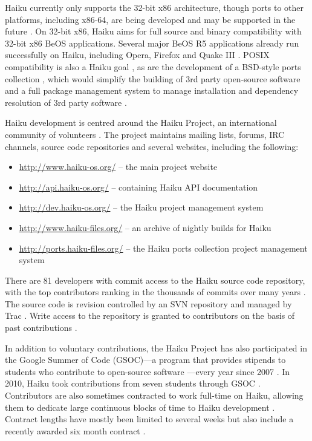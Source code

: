 \documentclass{article}
\begin{document}
Haiku currently only supports the 32-bit x86 architecture, though
ports to other platforms, including x86-64, are being developed and
may be supported in the future \cite{HaikuFaq}.  On 32-bit x86, Haiku
aims for full source and binary compatibility with 32-bit x86 BeOS
applications.  Several major BeOS R5 applications already run
successfully on Haiku, including Opera, Firefox and Quake III
\cite{HaikuWiki}.  POSIX compatibility is also a Haiku goal
\cite{HaikuFuture, HaikuIncContracts}, as are the development of a
BSD-style ports collection \cite{HaikuPorts}, which would simplify the
building of 3rd party open-source software and a full package
management system to manage installation and dependency resolution of
3rd party software \cite{HaikuR1A3Notes}.

Haiku development is centred around the Haiku Project, an
international community of volunteers \cite{HaikuAbout}.  The project
maintains mailing lists, forums, IRC channels, \cite{HaikuComm} source
code repositories \cite{HaikuGetSvn} and several websites, including
the following:
\begin{itemize}
  \item \url{http://www.haiku-os.org/} -- the main project website
  \item \url{http://api.haiku-os.org/} -- containing Haiku API documentation
  \item \url{http://dev.haiku-os.org/} -- the Haiku project management
    system
  \item \url{http://www.haiku-files.org/} -- an archive of nightly
    builds for Haiku
  \item \url{http://ports.haiku-files.org/} -- the Haiku ports collection
    project management system
\end{itemize}

There are 81 developers with commit access to the Haiku source code
repository, with the top contributors ranking in the thousands of
commits over many years \cite{HaikuContrib}.  The source code is
revision controlled by an SVN repository and managed by Trac
\cite{HaikuDevStart}.  Write access to the repository is granted to
contributors on the basis of past contributions \cite{HaikuDevStart}.

In addition to voluntary contributions, the Haiku Project has also
participated in the Google Summer of Code (GSOC)---a program that
provides stipends to students who contribute to open-source software
\cite{GSOCWiki}---every year since 2007 \cite{HaikuGSOC}.  In 2010,
Haiku took contributions from seven students through GSOC
\cite{HaikuGSOC2010}.  Contributors are also sometimes contracted to
work full-time on Haiku, allowing them to dedicate large continuous
blocks of time to Haiku development \cite{HaikuIncContracts}.
Contract lengths have mostly been limited to several weeks but also
include a recently awarded six month contract
\cite{HaikuLongContract}.
\end{document}
